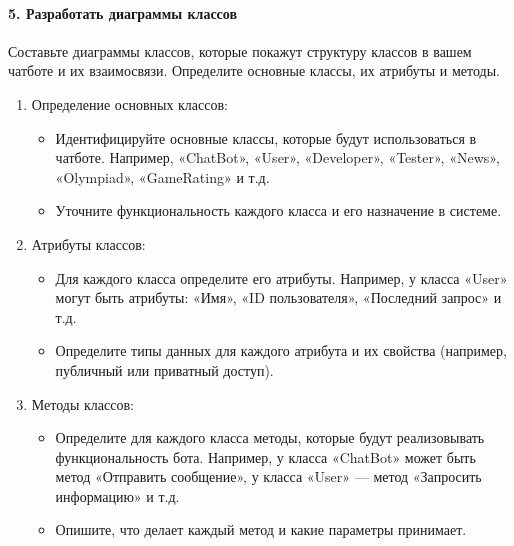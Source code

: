 \documentclass[letterpaper,10pt,russian]{sphinxmanual}
\begin{document}
\paragraph{5. Разработать диаграммы классов}
\label{\detokenize{educational_materials/uml/content:id14}}
\sphinxAtStartPar
Составьте диаграммы классов, которые покажут структуру классов в вашем чат\sphinxhyphen{}боте и их взаимосвязи. Определите основные классы, их атрибуты и методы.
\begin{enumerate}
%
\item {} 
\sphinxAtStartPar
Определение основных классов:
\begin{itemize}
\item {} 
\sphinxAtStartPar
Идентифицируйте основные классы, которые будут использоваться в чат\sphinxhyphen{}боте. Например, «ChatBot», «User», «Developer», «Tester», «News», «Olympiad», «GameRating» и т.д.

\item {} 
\sphinxAtStartPar
Уточните функциональность каждого класса и его назначение в системе.

\end{itemize}

\item {} 
\sphinxAtStartPar
Атрибуты классов:
\begin{itemize}
\item {} 
\sphinxAtStartPar
Для каждого класса определите его атрибуты. Например, у класса «User» могут быть атрибуты: «Имя», «ID пользователя», «Последний запрос» и т.д.

\item {} 
\sphinxAtStartPar
Определите типы данных для каждого атрибута и их свойства (например, публичный или приватный доступ).

\end{itemize}

\item {} 
\sphinxAtStartPar
Методы классов:
\begin{itemize}
\item {} 
\sphinxAtStartPar
Определите для каждого класса методы, которые будут реализовывать функциональность бота. Например, у класса «ChatBot» может быть метод «Отправить сообщение», у класса «User» — метод «Запросить информацию» и т.д.

\item {} 
\sphinxAtStartPar
Опишите, что делает каждый метод и какие параметры принимает.


\end{itemize}
\end{enumerate}
\end{document}
